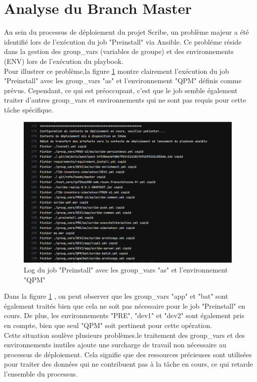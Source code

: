 {\section{Analyse du Branch Master}
Au sein du processus de déploiement du projet Scribe, un problème majeur a été identifié lors de l'exécution du job "Preinstall" via Ansible. Ce probléme réside dans la gestion des group\_vars (variables de groupe) et des environnements (ENV) lors de l'exécution du playbook.\\
Pour illustrer ce problème,la figure \ref{figlog} montre clairement l'exécution du job "Preinstall" avec les group\_vars "as" et l'environnement "QPM" définis comme prévus. Cependant, ce qui est préoccupant, c'est que le job semble également traiter d'autres group\_vars et environnements qui ne sont pas requis pour cette tâche spécifique.
\begin{figure}[htbp]
     \centering
  \includegraphics[scale=0.5]{img/faraaaaah2.png}
        \caption{Log du job "Preinstall" avec les group\_vars "as" et l'environnement "QPM"} 
  \label{figlog}
 \end{figure}
 \newpage
 Dans la figure \ref{figlog} , on peut observer que les group\_vars "app" et "bat" sont également traités bien que cela ne soit pas nécessaire pour le job "Preinstall" en cours. De plus, les environnements "PRE", "dev1" et "dev2" sont également pris en compte, bien que seul "QPM" soit pertinent pour cette opération.\\
 Cette situation soulève plusieurs problèmes.le traitement des group\_vars et des environnements inutiles ajoute une surcharge de travail non nécessaire au processus de déploiement. Cela signifie que des ressources précieuses sont utilisées pour traiter des données qui ne contribuent pas à la tâche en cours, ce qui retarde l'ensemble du processus.\\

}
